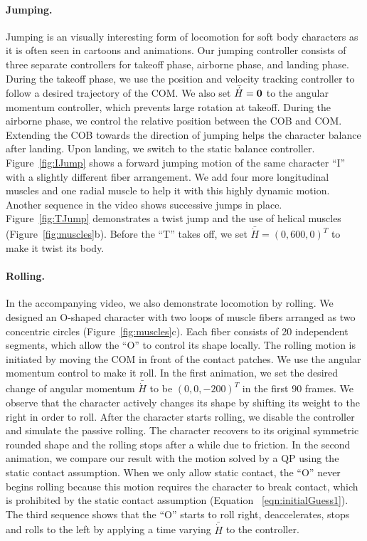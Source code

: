 \paragraph{Jumping.} Jumping is an visually interesting form of
locomotion for soft body characters as it is often seen in cartoons
and animations. Our jumping controller consists of three separate
controllers for takeoff phase, airborne phase, and landing
phase. During the takeoff phase, we use the position and velocity
tracking controller to follow a desired trajectory of the COM. We also
set $\bar{\dot{H}}=\mathbf{0}$ to the angular momentum controller, which
prevents large rotation at takeoff.  During the airborne phase, we control the relative
position between the COB and COM. Extending the COB towards the
direction of jumping helps the character balance after landing. Upon
landing, we switch to the static balance controller.
Figure~\ref{fig:IJump} shows a forward jumping motion of the same
character ``I'' with a slightly different fiber arrangement.
We add four more longitudinal muscles and one radial muscle to help it with this highly dynamic motion.
Another sequence in the video shows successive jumps in place.
Figure~\ref{fig:TJump} demonstrates
a twist jump and the use of helical muscles
(Figure~\ref{fig:muscles}b).  Before the ``T'' takes off, we set
$\bar{\dot{H}}=(0, 600, 0)^T$ to make it twist its body.

\paragraph{Rolling.} In the accompanying video, we also demonstrate
locomotion by rolling. We designed an O-shaped character with two
loops of muscle fibers arranged as two concentric circles
(Figure~\ref{fig:muscles}c). Each fiber consists of 20 independent segments, which allow
the ``O'' to control its shape locally. The rolling motion is initiated by moving the COM in front of the contact patches. We use the angular momentum control to
make it roll. In the first animation, we set the desired
change of angular momentum $\bar{\dot{H}}$ to be $(0, 0, -200)^T$ in
the first 90 frames. We observe that the character actively changes its
shape by shifting its weight to the right in order to roll. After the character starts rolling,
we disable the controller
and simulate the passive rolling. The character recovers to its
original symmetric rounded shape and the rolling stops after a while
due to friction. In the second animation, we compare our result with
the motion solved by a QP using the static contact assumption.  When we only
allow static contact, the ``O'' never begins rolling because this
motion requires the character to break contact, which is prohibited by the static contact assumption (Equation ~\ref{eqn:initialGuess1}).  The third sequence
shows that the ``O'' starts to roll right, deaccelerates, stops
and rolls to the left by applying a time varying $\bar{\dot{H}}$ to
the controller.

